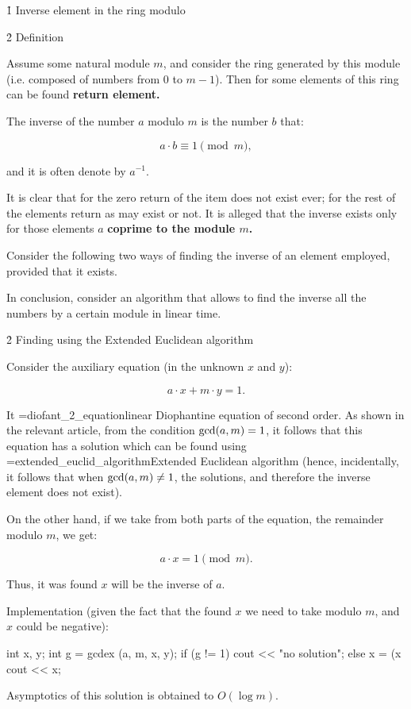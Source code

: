 \h1{ Inverse element in the ring modulo }


\h2{ Definition }

Assume some natural module $m$, and consider the ring generated by this module (i.e. composed of numbers from $0$ to $m-1$). Then for some elements of this ring can be found \bf{return element}.

The inverse of the number $a$ modulo $m$ is the number $b$ that:

$$ a \cdot b \equiv 1 \pmod m, $$

and it is often denote by $a^{-1}$.

It is clear that for the zero return of the item does not exist ever; for the rest of the elements return as may exist or not. It is alleged that the inverse exists only for those elements $a$ \bf{coprime} to the module $m$.

Consider the following two ways of finding the inverse of an element employed, provided that it exists.

In conclusion, consider an algorithm that allows to find the inverse all the numbers by a certain module in linear time.


\h2{ Finding using the Extended Euclidean algorithm }

Consider the auxiliary equation (in the unknown $x$ and $y$):

$$ a \cdot x + m \cdot y = 1. $$

It \algohref=diofant_2_equation{linear Diophantine equation of second order}. As shown in the relevant article, from the condition ${\rm gcd}(a,m)=1$, it follows that this equation has a solution which can be found using \algohref=extended_euclid_algorithm{Extended Euclidean algorithm} (hence, incidentally, it follows that when ${\rm gcd}(a,m) \ne 1$, the solutions, and therefore the inverse element does not exist).

On the other hand, if we take from both parts of the equation, the remainder modulo $m$, we get:

$$ a \cdot x = 1 \pmod m. $$

Thus, it was found $x$ will be the inverse of $a$.

Implementation (given the fact that the found $x$ we need to take modulo $m$, and $x$ could be negative):

\code
int x, y;
int g = gcdex (a, m, x, y);
if (g != 1)
cout << "no solution";
else {
x = (x %
cout << x;
}
\endcode

Asymptotics of this solution is obtained to $O (\log m)$.


